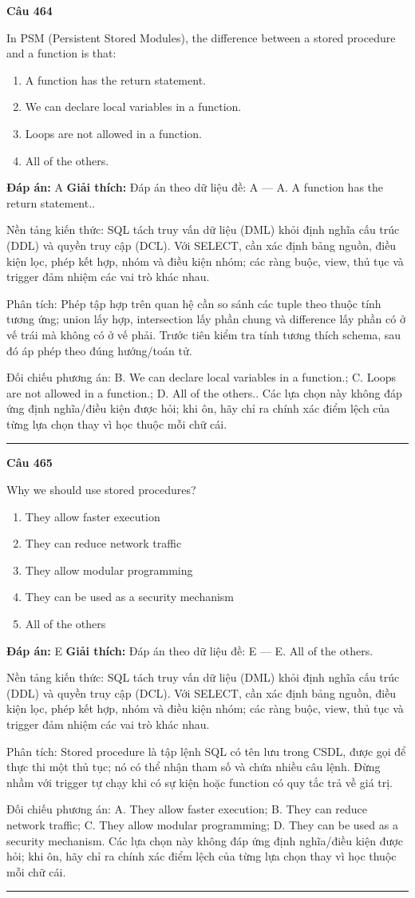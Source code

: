 \documentclass[11pt,a4paper]{article}
\newenvironment{question}[1]{%
  \par\vspace{1em}\noindent\textbf{\large Câu #1}\par\vspace{0.4em}
}{%
  \par\vspace{1em}\hrule\vspace{0.6em}
}
\newenvironment{choices}{%
  \begin{enumerate}[label=\textbf{\Alph*.},leftmargin=2.2em,itemsep=2pt,topsep=3pt]
}{%
  \end{enumerate}
}
\newcommand{\choice}{\item}
\begin{document}
\begin{question}{464}
In PSM (Persistent Stored Modules), the difference between a stored procedure and a function is that:
\begin{choices}
\choice A function has the return statement.
\choice We can declare local variables in a function.
\choice Loops are not allowed in a function.
\choice All of the others.
\end{choices}
\textbf{Đáp án:} A
\textbf{Giải thích:} Đáp án theo dữ liệu đề: A — A. A function has the return statement..

Nền tảng kiến thức: SQL tách truy vấn dữ liệu (DML) khỏi định nghĩa cấu trúc (DDL) và quyền truy cập (DCL). Với SELECT, cần xác định bảng nguồn, điều kiện lọc, phép kết hợp, nhóm và điều kiện nhóm; các ràng buộc, view, thủ tục và trigger đảm nhiệm các vai trò khác nhau.

Phân tích: Phép tập hợp trên quan hệ cần so sánh các tuple theo thuộc tính tương ứng; union lấy hợp, intersection lấy phần chung và difference lấy phần có ở vế trái mà không có ở vế phải. Trước tiên kiểm tra tính tương thích schema, sau đó áp phép theo đúng hướng/toán tử.

Đối chiếu phương án: B. We can declare local variables in a function.; C. Loops are not allowed in a function.; D. All of the others.. Các lựa chọn này không đáp ứng định nghĩa/điều kiện được hỏi; khi ôn, hãy chỉ ra chính xác điểm lệch của từng lựa chọn thay vì học thuộc mỗi chữ cái.
\end{question}

\begin{question}{465}
Why we should use stored procedures?
\begin{choices}
\choice They allow faster execution
\choice They can reduce network traffic
\choice They allow modular programming
\choice They can be used as a security mechanism
\choice All of the others
\end{choices}
\textbf{Đáp án:} E
\textbf{Giải thích:} Đáp án theo dữ liệu đề: E — E. All of the others.

Nền tảng kiến thức: SQL tách truy vấn dữ liệu (DML) khỏi định nghĩa cấu trúc (DDL) và quyền truy cập (DCL). Với SELECT, cần xác định bảng nguồn, điều kiện lọc, phép kết hợp, nhóm và điều kiện nhóm; các ràng buộc, view, thủ tục và trigger đảm nhiệm các vai trò khác nhau.

Phân tích: Stored procedure là tập lệnh SQL có tên lưu trong CSDL, được gọi để thực thi một thủ tục; nó có thể nhận tham số và chứa nhiều câu lệnh. Đừng nhầm với trigger tự chạy khi có sự kiện hoặc function có quy tắc trả về giá trị.

Đối chiếu phương án: A. They allow faster execution; B. They can reduce network traffic; C. They allow modular programming; D. They can be used as a security mechanism. Các lựa chọn này không đáp ứng định nghĩa/điều kiện được hỏi; khi ôn, hãy chỉ ra chính xác điểm lệch của từng lựa chọn thay vì học thuộc mỗi chữ cái.
\end{question}
\end{document}
